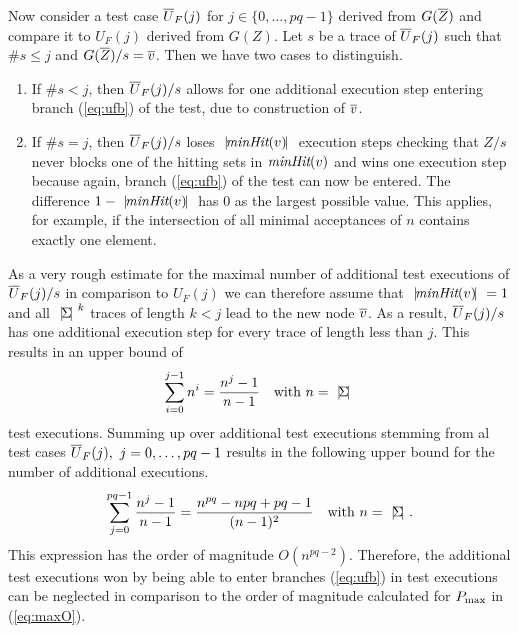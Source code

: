 Now consider a test case ${\overline U}_F(j)$ for $j\in\{ 0,\dots,pq-1 \}$ derived from $G(\overline Z)$
and compare it to $U_F(j)$ derived from $G(Z)$. Let $s$ be a trace of  ${\overline U}_F(j)$ such that
$\#s\le j$ and   $G(\overline Z)/s = \overline v$. Then we have two cases to distinguish.
\begin{enumerate}
\item If $\#s < j$, then ${\overline U}_F(j)/s$ allows for one additional execution step entering branch 
(\ref{eq:ufb}) of the test, due to construction of $\overline v$.

\item If $\#s = j$, then ${\overline U}_F(j)/s$ loses ${~|\! \text{\it minHit}(v)\!|~}$ execution steps checking 
that $Z/s$ never blocks one of the hitting sets in $\text{\it minHit}(v)$ and wins one execution step 
because again, branch 
(\ref{eq:ufb}) of the test can now be entered. The difference $1 - {~|\! \text{\it minHit}(v)\!|~}$ has 0 as
the largest possible value. This applies, for example, if the intersection of 
all minimal acceptances of $n$ contains exactly one element.
\end{enumerate}

As a very rough estimate for the maximal number of additional test executions of ${\overline U}_F(j)/s$
in comparison to $U_F(j)$ we can therefore assume that ${~|\! \text{\it minHit}(v)\!|~} = 1$ and all
${~|\! \Sigma\!|~}^k$ traces of length $k < j$ lead to the new node $\overline v$. As a result,
${\overline U}_F(j)/s$ has one additional execution step for every trace of length less than $j$.  
This results in an upper bound of 
\begin{equation}
\sum_{i=0}^{j-1}n^i = \frac{n^j - 1}{n - 1} \quad\text{with}\ n = {~|\! \Sigma\!|~}
\end{equation}
test executions. Summing up over additional test executions stemming from al test cases 
 ${\overline U}_F(j),\ j = 0,\dots,pq-1$ results in the following upper bound for the number of 
 additional executions.
\begin{equation}
\sum_{j=0}^{pq-1}\frac{n^j - 1}{n - 1} = \frac{n^{pq} - npq + pq - 1}{(n-1)^2}\quad\text{with}\ 
n=\card{\Sigma}.
\end{equation}
This expression has the order of magnitude $O(n^{pq-2})$.  Therefore, the additional test executions won by being able to enter branches (\ref{eq:ufb}) in test executions  can be neglected in comparison to the order of magnitude calculated for $P_\text{max}$ in (\ref{eq:maxO}).  




